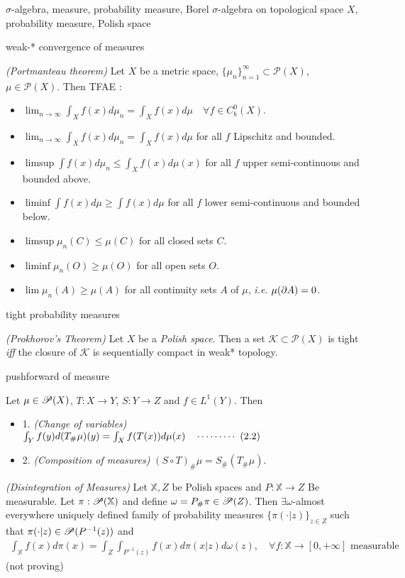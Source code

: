 \documentclass[10pt,a4paper]{article}
\renewenvironment{i}
{\begin{itemize} 
	}%
	{\end{itemize}
}
\begin{document}
 $\sigma$-algebra, measure, probability measure, Borel $\sigma$-algebra on topological space $X$, probability measure, Polish space
\s

 weak-* convergence of measures
\s

 \emph{(Portmanteau theorem)} Let $X$ be a metric space, $\{\mu_n\}_{n=1}^{\infty} \subset \mathscr{P}(X)$, $\mu \in \mathscr{P}(X)$. Then TFAE :
\begin{i}
\item $\lim_{n\rightarrow \infty} \int_X f(x) d\mu_n =\int_X f(x) d\mu \quad \forall f\in C_b^0(X)$.
\item $\lim_{n\rightarrow \infty} \int_X f(x) d\mu_n =\int_X f(x) d\mu$ for all $f$ Lipschitz and bounded.
\item $\limsup \int f(x) d\mu_n \leq \int_X f(x) d\mu(x)$ for all $f$ upper semi-continuous and bounded above.
\item $\liminf \int f(x) d\mu \geq \int f(x) d\mu$ for all $f$ lower semi-continuous and bounded below.
\item $\limsup \mu_n(C) \leq \mu(C)$ for all closed sets $C$.
\item $\liminf \mu_n(O) \geq \mu(O)$ for all open sets $O$.
\item $\lim \mu_n(A) \geq \mu(A)$ for all continuity sets $A$ of $\mu$, \textit{i.e.} $\mu(\partial A) =0$.
\end{i}
\s

 tight probability measures
\s

 \emph{(Prokhorov's Theorem)} Let $X$ be a \emph{Polish space}. Then a set $\mathscr{K} \subset \mathscr{P}(X)$ is tight \textit{iff} the closure of $\mathscr{K}$ is sequentially compact in weak* topology.
\s

 pushforward of measure
\s

 Let $\mu \in \mathscr{P}(X)$, $T: X\rightarrow Y$, $S:Y\rightarrow Z$ and $f\in L^1(Y)$. Then
\begin{i}
\item[1.] \emph{(Change of variables)} $\int_Y f(y)d(T_{\#} \mu) (y) = \int_X f(T(x))d\mu(x) \quad \cdots\cdots\cdots\,\,(2.2)$
\item[2.] \emph{(Composition of measures)} $(S\circ T)_{\#}\mu = S_{\#}(T_{\#}\mu)$. 
\end{i}
\s

 \emph{(Disintegration of Measures)} Let $\mathbb{X}, Z$ be Polish spaces and $P : \mathbb{X}\rightarrow Z$ Be measurable. Let $\pi : \mathscr{P}(\mathbb{X})$ and define $\omega= P_{\#} \pi \in \mathscr{P}(Z)$. Then $\exists \omega$-almost everywhere uniquely defined family of probability measures $\{\pi(\cdot |z)\}_{z\in Z}$ such that $\pi(\cdot |z) \in \mathscr{P}(P^{-1}(z))$ and
\begin{align*}
\int_{\mathbb{X}} f(x) d\pi(x) = \int_Z \int_{P^{-1}(z)} f(x) d\pi(x|z)d\omega(z), \quad \forall f: \mathbb{X}\rightarrow [0, +\infty] \text{ measurable}
\end{align*}
(not proving)
\s
\end{document}
